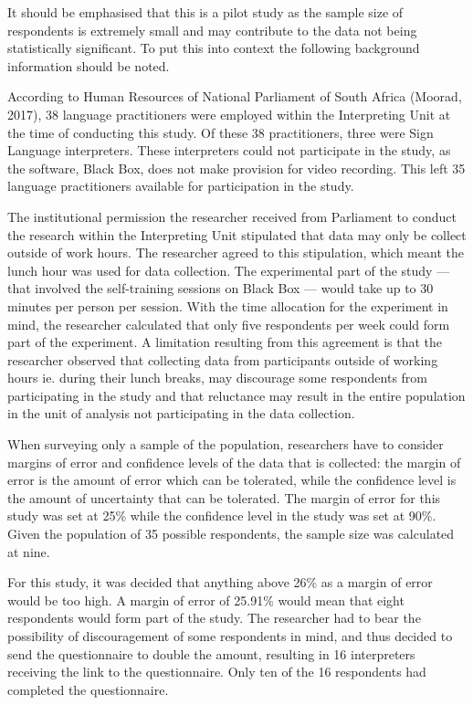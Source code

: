 \documentclass[output=paper]{langsci/langscibook}
\begin{document}
It should be emphasised that this is a pilot study as the sample size of respondents is extremely small and may contribute to the data not being statistically significant. To put this into context the following background information should be noted. 

According to Human Resources of National Parliament of South Africa (Moorad, 2017), 38 language practitioners were employed within the Interpreting Unit at the time of conducting this study. Of these 38 practitioners, three were Sign Language interpreters. These interpreters could not participate in the study, as the software, Black Box, does not make provision for video recording. This left 35 language practitioners available for participation in the study. 

The institutional permission the researcher received from Parliament to conduct the research within the Interpreting Unit stipulated that data may only be collect outside of work hours. The researcher agreed to this stipulation, which meant the lunch hour was used for data collection. The experimental part of the study — that involved the self-training sessions on Black Box — would take up to 30 minutes per person per session. With the time allocation for the experiment in mind, the researcher calculated that only five respondents per week could form part of the experiment. A limitation resulting from this agreement is that the researcher observed that collecting data from participants outside of working hours ie. during their lunch breaks, may discourage some respondents from participating in the study and that reluctance may result in the entire population in the unit of analysis not participating in the data collection. 

When surveying only a sample of the population, researchers have to consider margins of error and confidence levels of the data that is collected: the margin of error is the amount of error which can be tolerated, while the confidence level is the amount of uncertainty that can be tolerated. The margin of error for this study was set at 25\% while the confidence level in the study was set at 90\%. Given the population of 35 possible respondents, the sample size was calculated at nine. 

For this study, it was decided that anything above 26\% as a margin of error would be too high. A margin of error of 25.91\% would mean that eight respondents would form part of the study. The researcher had to bear the possibility of discouragement of some respondents in mind, and thus decided to send the questionnaire to double the amount, resulting in 16 interpreters receiving the link to the questionnaire. Only ten of the 16 respondents had completed the questionnaire.
\end{document}
